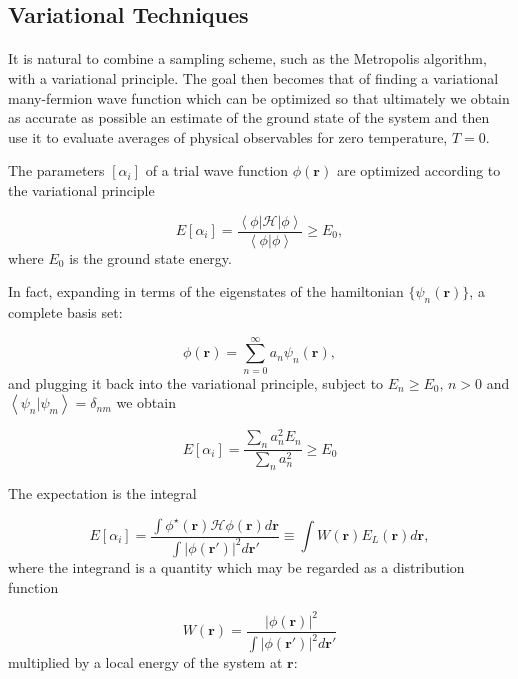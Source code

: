 \documentclass[10pt, twocolumn, twoside]{article}
\begin{document}
\subsection{Variational Techniques}\paragraph{}

It is natural to combine a sampling scheme, such as the Metropolis algorithm, with a variational principle. The goal then becomes that of finding a variational many-fermion wave function which can be optimized so that ultimately we obtain as accurate as possible an estimate of the ground state of the system and then use it to evaluate averages of physical observables for zero temperature, $T=0$.

The parameters $[\alpha_i]$ of a trial wave function $\phi(\bm r)$ are optimized according to the variational principle

\begin{equation}
E[\alpha_i] = \frac{\left\langle \phi \left| \mathcal{H} \right| \phi \right\rangle}{\left\langle \phi | \phi \right\rangle} \ge E_0,
\end{equation}
where $E_0$ is the ground state energy.

In fact, expanding in terms of the eigenstates of the hamiltonian $\{ \psi_n (\bm r) \}$, a complete basis set:

\begin{equation}
\phi (\bm r) = \sum_{n= 0}^{\infty} a_n \psi_n (\bm r) ,
\end{equation}
and plugging it back into the variational principle, subject to $E_n \ge E_0 ,\, n > 0$ and $\left\langle \psi_n | \psi_m \right\rangle = \delta_{nm}$ we obtain

\begin{equation}
E[\alpha_i] = \frac{\sum_n a_n^2 E_n}{\sum_n a_n^2 } \ge E_0
\end{equation}

The expectation is the integral

\begin{equation}
E[\alpha_i] = \frac{\int \phi^\star (\bm r) \mathcal{H} \phi (\bm r) d\bm r}{\int | \phi (\bm r') |^2 d\bm r'} \equiv \int W(\bm r) E_L(\bm r) d\bm r ,
\end{equation}
where the integrand is a quantity which may be regarded as a distribution function 

\begin{equation}
W(\bm r) = \frac{|\phi (\bm r)|^2}{\int |\phi(\bm r')|^2 d\bm r'}
\end{equation}
multiplied by a local energy of the system at $\bm r$:
\end{document}
